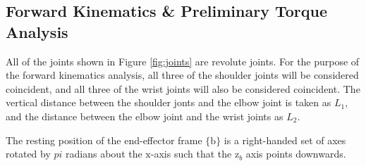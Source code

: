 \documentclass[a4paper,11pt]{article}
\begin{document}
\subsection{Forward Kinematics \& Preliminary Torque Analysis}\label{sec:forward_kinematics}

All of the joints shown in Figure \ref{fig:joints} are revolute joints. For the purpose of the forward kinematics analysis, all three of the shoulder joints will be considered coincident, and all three of the wrist joints will also be considered coincident. The vertical distance between the shoulder jonts and the elbow joint is taken as $L_1$, and the distance between the elbow joint and the wrist joints as $L_2$.

The resting position of the end-effector frame $\{\mathrm{b}\}$ is a right-handed set of axes rotated by $pi$ radians about the $\mathrm{x}$-axis such that the $\mathrm{z}_{b}$ axis points downwards.
\end{document}
